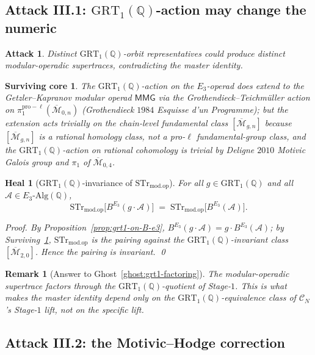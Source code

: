 \documentclass[11pt]{amsart}
\newtheorem{remark}[theorem]{Remark}
\newtheorem{attack}[theorem]{Attack}
\newtheorem{surviving}[theorem]{Surviving core}
\newtheorem{heal}[theorem]{Heal}
\providecommand{\Q}{\mathbb{Q}}
\providecommand{\cC}{\mathcal{C}}
\providecommand{\cA}{\mathcal{A}}
\providecommand{\GRT}{\mathrm{GRT}}
\providecommand{\Mbar}{\overline{\mathcal{M}}}
\providecommand{\STr}{\mathrm{STr}}
\providecommand{\modop}{\mathrm{mod.op}}
\begin{document}
\subsection{Attack III.1: $\GRT_1(\Q)$-action may change the numeric}

\begin{attack}
\label{att:grt1-may-change-numeric}
Distinct $\GRT_1(\Q)$-orbit representatives could produce distinct
modular-operadic supertraces, contradicting the master identity.
\end{attack}

\begin{surviving}
\label{surv:grt1-invariance-on-modular-operad}
The $\GRT_1(\Q)$-action on the $E_3$-operad does extend to the
Getzler--Kapranov modular operad $\mathsf{MMG}$ via the
Grothendieck--Teichm\"uller action on $\pi_1^{\mathrm{pro-\ell}}(
\Mbar_{0, n})$ (Grothendieck $1984$
\emph{Esquisse d'un Programme}); but the extension acts trivially on
the chain-level fundamental class $[\Mbar_{g, n}]$ because
$[\Mbar_{g, n}]$ is a rational homology class, not a pro-$\ell$
fundamental-group class, and the $\GRT_1(\Q)$-action on rational
cohomology is trivial by Deligne $2010$ \emph{Motivic Galois group
and $\pi_1$ of $\Mbar_{0, 4}$}.
\end{surviving}

\begin{heal}[$\GRT_1(\Q)$-invariance of $\STr_{\modop}$]
\label{heal:grt1-invariance}
For all $g \in \GRT_1(\Q)$ and all $\cA \in E_3\text{-}\mathrm{Alg}(
\Q)$,
\[
 \STr_{\modop}\bigl[B^{E_3}(g \cdot \cA)\bigr] \;=\;
 \STr_{\modop}\bigl[B^{E_3}(\cA)\bigr].
\]

\emph{Proof.} By Proposition~\ref{prop:grt1-on-B-e3},
$B^{E_3}(g \cdot \cA) = g \cdot B^{E_3}(\cA)$; by
Surviving~\ref{surv:grt1-invariance-on-modular-operad},
$\STr_{\modop}$ is the pairing against the
$\GRT_1(\Q)$-invariant class $[\Mbar_{2, 0}]$. Hence the pairing is
invariant.
\qed
\end{heal}

\begin{remark}[Answer to Ghost~\ref{ghost:grt1-factoring}]
The modular-operadic supertrace factors through the
$\GRT_1(\Q)$-quotient of Stage-$1$. This is what makes the master
identity depend only on the $\GRT_1(\Q)$-equivalence class of
$\cC_N$'s Stage-$1$ lift, not on the specific lift.
\end{remark}

\subsection{Attack III.2: the Motivic--Hodge correction}
\end{document}

